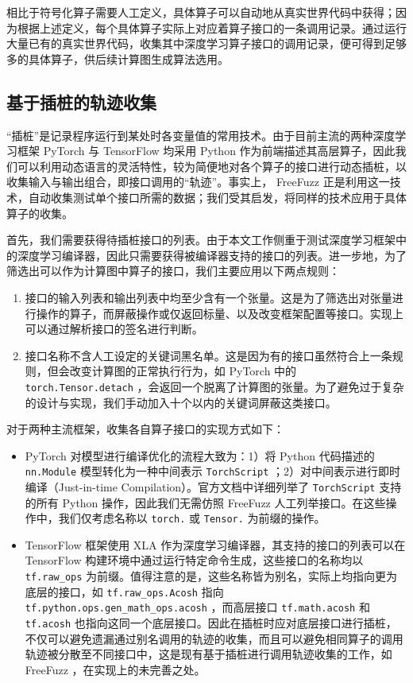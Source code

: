 相比于符号化算子需要人工定义，具体算子可以自动地从真实世界代码中获得；因为根据上述定义，每个具体算子实际上对应着算子接口的一条调用记录。通过运行大量已有的真实世界代码，收集其中深度学习算子接口的调用记录，便可得到足够多的具体算子，供后续计算图生成算法选用。

\subsection{基于插桩的轨迹收集}
\label{sec:collect}

“插桩”是记录程序运行到某处时各变量值的常用技术。由于目前主流的两种深度学习框架 PyTorch 与 TensorFlow 均采用 Python 作为前端描述其高层算子，因此我们可以利用动态语言的灵活特性，较为简便地对各个算子的接口进行动态插桩，以收集输入与输出组合，即接口调用的“轨迹”。事实上， FreeFuzz 正是利用这一技术，自动收集测试单个接口所需的数据；我们受其启发，将同样的技术应用于具体算子的收集。

首先，我们需要获得待插桩接口的列表。由于本文工作侧重于测试深度学习框架中的深度学习编译器，因此只需要获得被编译器支持的接口的列表。进一步地，为了筛选出可以作为计算图中算子的接口，我们主要应用以下两点规则：
\begin{enumerate}
    \item 接口的输入列表和输出列表中均至少含有一个张量。这是为了筛选出对张量进行操作的算子，而屏蔽操作或仅返回标量、以及改变框架配置等接口。实现上可以通过解析接口的签名进行判断。
    \item 接口名称不含人工设定的关键词黑名单。这是因为有的接口虽然符合上一条规则，但会改变计算图的正常执行行为，如 PyTorch 中的 \texttt{torch.Tensor.detach} ，会返回一个脱离了计算图的张量。为了避免过于复杂的设计与实现，我们手动加入十个以内的关键词屏蔽这类接口。
\end{enumerate}

对于两种主流框架，收集各自算子接口的实现方式如下：
\begin{itemize}
    \item PyTorch 对模型进行编译优化的流程大致为：1）将 Python 代码描述的 \texttt{nn.Module} 模型转化为一种中间表示 \texttt{TorchScript} ；2）对中间表示进行即时编译（Just-in-time Compilation）。官方文档\cite{torch_ops_doc}中详细列举了 \texttt{TorchScript} 支持的所有 Python 操作，因此我们无需仿照 FreeFuzz 人工列举接口。在这些操作中，我们仅考虑名称以 \texttt{torch.} 或 \texttt{Tensor.} 为前缀的操作。
    
    \item TensorFlow 框架使用 XLA 作为深度学习编译器，其支持的接口的列表可以在 TensorFlow 构建环境中通过运行特定命令生成\cite{tf_ops_doc}，这些接口的名称均以 \texttt{tf.raw\_ops} 为前缀。值得注意的是，这些名称皆为别名，实际上均指向更为底层的接口，如 \texttt{tf.raw\_ops.Acosh} 指向 \texttt{tf.python.ops.gen\_math\_ops.acosh} ，而高层接口 \texttt{tf.math.acosh} 和 \texttt{tf.acosh} 也指向这同一个底层接口。因此在插桩时应对底层接口进行插桩，不仅可以避免遗漏通过别名调用的轨迹的收集，而且可以避免相同算子的调用轨迹被分散至不同接口中，这是现有基于插桩进行调用轨迹收集的工作，如 FreeFuzz ，在实现上的未完善之处。
\end{itemize}

